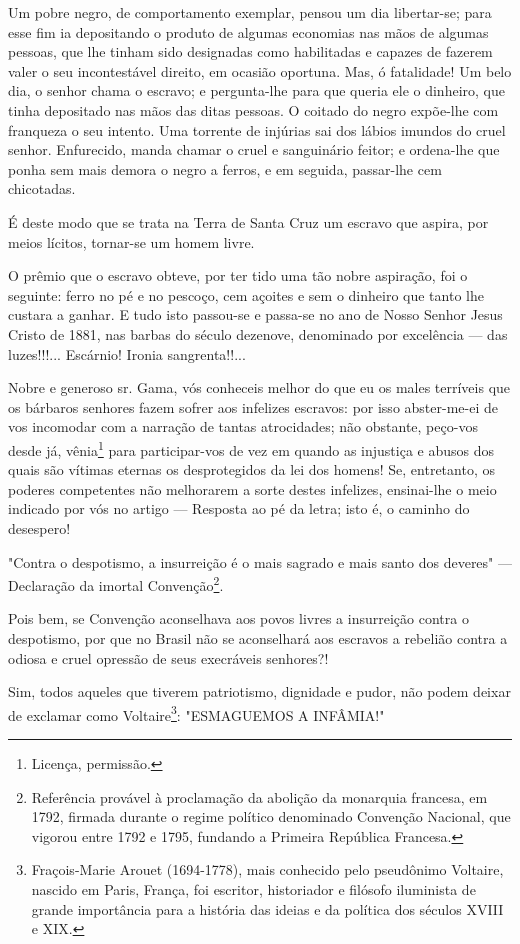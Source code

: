 Um pobre negro, de comportamento exemplar, pensou um dia libertar-se;
para esse fim ia depositando o produto de algumas economias nas mãos de
algumas pessoas, que lhe tinham sido designadas como habilitadas e
capazes de fazerem valer o seu incontestável direito, em ocasião
oportuna. Mas, ó fatalidade! Um belo dia, o senhor chama o escravo; e
pergunta-lhe para que queria ele o dinheiro, que tinha depositado nas
mãos das ditas pessoas. O coitado do negro expõe-lhe com franqueza o seu
intento. Uma torrente de injúrias sai dos lábios imundos do cruel
senhor. Enfurecido, manda chamar o cruel e sanguinário feitor; e
ordena-lhe que ponha sem mais demora o negro a ferros, e em seguida,
passar-lhe cem chicotadas.

É deste modo que se trata na Terra de Santa Cruz um escravo que aspira,
por meios lícitos, tornar-se um homem livre.

O prêmio que o escravo obteve, por ter tido uma tão nobre aspiração, foi
o seguinte: ferro no pé e no pescoço, cem açoites e sem o dinheiro que
tanto lhe custara a ganhar. E tudo isto passou-se e passa-se no ano de
Nosso Senhor Jesus Cristo de 1881, nas barbas do século dezenove,
denominado por excelência --- das luzes!!!... Escárnio! Ironia
sangrenta!!...

Nobre e generoso sr. Gama, vós conheceis melhor do que eu os males
terríveis que os bárbaros senhores fazem sofrer aos infelizes escravos:
por isso abster-me-ei de vos incomodar com a narração de tantas
atrocidades; não obstante, peço-vos desde já, vênia\footnote{Licença,
  permissão.} para participar-vos de vez em quando as injustiça e abusos
dos quais são vítimas eternas os desprotegidos da lei dos homens! Se,
entretanto, os poderes competentes não melhorarem a sorte destes
infelizes, ensinai-lhe o meio indicado por vós no artigo --- Resposta
ao pé da letra; isto é, o caminho do desespero!

"Contra o despotismo, a insurreição é o mais sagrado e mais santo dos
deveres" --- Declaração da imortal Convenção\footnote{Referência
  provável à proclamação da abolição da monarquia francesa, em 1792,
  firmada durante o regime político denominado Convenção Nacional, que
  vigorou entre 1792 e 1795, fundando a Primeira República Francesa.}.

Pois bem, se Convenção aconselhava aos povos livres a insurreição contra
o despotismo, por que no Brasil não se aconselhará aos escravos a
rebelião contra a odiosa e cruel opressão de seus execráveis senhores?!

Sim, todos aqueles que tiverem patriotismo, dignidade e pudor, não podem
deixar de exclamar como Voltaire\footnote{Fraçois-Marie Arouet
  (1694-1778), mais conhecido pelo pseudônimo Voltaire, nascido em
  Paris, França, foi escritor, historiador e filósofo iluminista de
  grande importância para a história das ideias e da política dos
  séculos XVIII e XIX.}:
"ESMAGUEMOS A INFÂMIA!"


